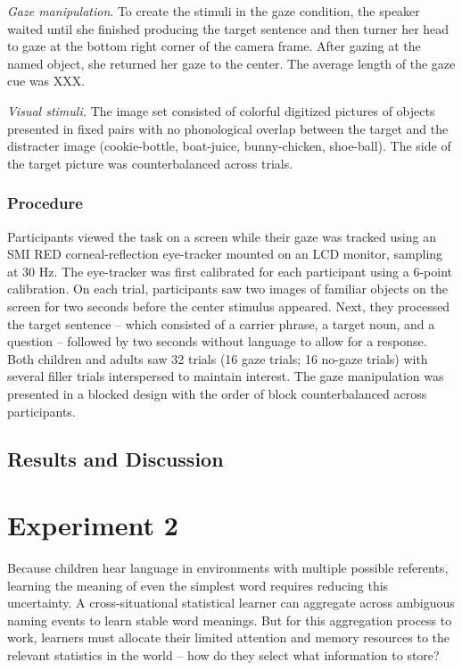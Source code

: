\documentclass[man,floatsintext]{apa6}
\begin{document}
\emph{Gaze manipulation}. To create the stimuli in the gaze condition,
the speaker waited until she finished producing the target sentence and
then turner her head to gaze at the bottom right corner of the camera
frame. After gazing at the named object, she returned her gaze to the
center. The average length of the gaze cue was XXX.

\emph{Visual stimuli.} The image set consisted of colorful digitized
pictures of objects presented in fixed pairs with no phonological
overlap between the target and the distracter image (cookie-bottle,
boat-juice, bunny-chicken, shoe-ball). The side of the target picture
was counterbalanced across trials.

\hypertarget{procedure}{%
\subsubsection{Procedure}\label{procedure}}

Participants viewed the task on a screen while their gaze was tracked
using an SMI RED corneal-reflection eye-tracker mounted on an LCD
monitor, sampling at 30 Hz. The eye-tracker was first calibrated for
each participant using a 6-point calibration. On each trial,
participants saw two images of familiar objects on the screen for two
seconds before the center stimulus appeared. Next, they processed the
target sentence -- which consisted of a carrier phrase, a target noun,
and a question -- followed by two seconds without language to allow for
a response. Both children and adults saw 32 trials (16 gaze trials; 16
no-gaze trials) with several filler trials interspersed to maintain
interest. The gaze manipulation was presented in a blocked design with
the order of block counterbalanced across participants.

\hypertarget{results-and-discussion}{%
\subsection{Results and Discussion}\label{results-and-discussion}}

\hypertarget{experiment-2}{%
\section{Experiment 2}\label{experiment-2}}

Because children hear language in environments with multiple possible
referents, learning the meaning of even the simplest word requires
reducing this uncertainty. A cross-situational statistical learner can
aggregate across ambiguous naming events to learn stable word meanings.
But for this aggregation process to work, learners must allocate their
limited attention and memory resources to the relevant statistics in the
world -- how do they select what information to store?
\end{document}
